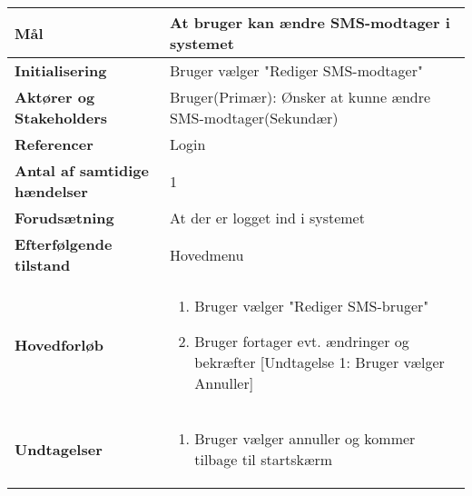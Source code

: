 \begin{table}[H] \centering
\begin{tabular}{|p{6cm}|p{8cm}|}
	\hline
\textbf{Mål} &
At bruger kan ændre SMS-modtager i systemet\\\hline

\textbf{Initialisering} &
  Bruger vælger "Rediger SMS-modtager"\\\hline
 
\textbf{Aktører og Stakeholders} &
Bruger(Primær): Ønsker at kunne ændre SMS-modtager(Sekundær)  \\\hline

\textbf{Referencer} &
Login  \\\hline

\textbf{Antal af samtidige hændelser} &
1  \\\hline

\textbf{Forudsætning} &
At der er logget ind i systemet  \\\hline

\textbf{Efterfølgende tilstand} &
Hovedmenu  \\\hline

\textbf{Hovedforløb} &
\begin{enumerate}

\item Bruger vælger "Rediger SMS-bruger"
\item Bruger fortager evt. ændringer og bekræfter [Undtagelse 1: Bruger vælger Annuller]

\end{enumerate}   
 \\\hline
 
\textbf{Undtagelser}
&\begin{enumerate}[label= \ref{UC8und1}a.]
\item Bruger vælger annuller og kommer tilbage til startskærm
\end{enumerate}
 \\\hline
 
	\end{tabular}
	\label{UC6} 
\end{table}